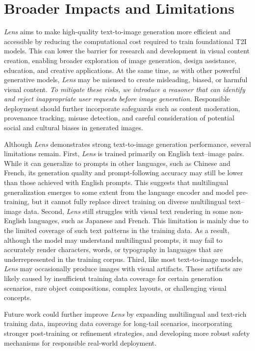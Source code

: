 \documentclass{llmxive}
\begin{document}
\section{Broader Impacts and Limitations}
\label{sec:limitations}

\textit{Lens} aims to make high-quality text-to-image generation more efficient and accessible by reducing the computational cost required to train foundational T2I models. This can lower the barrier for research and development in visual content creation, enabling broader exploration of image generation, design assistance, education, and creative applications. At the same time, as with other powerful generative models, \textit{Lens} may be misused to create misleading, biased, or harmful visual content. \textit{To mitigate these risks, we introduce a reasoner that can identify and reject inappropriate user requests before image generation.} Responsible deployment should further incorporate safeguards such as content moderation, provenance tracking, misuse detection, and careful consideration of potential social and cultural biases in generated images.

Although \textit{Lens} demonstrates strong text-to-image generation performance, several limitations remain. First, \textit{Lens} is trained primarily on English text--image pairs. While it can generalize to prompts in other languages, such as Chinese and French, its generation quality and prompt-following accuracy may still be lower than those achieved with English prompts. This suggests that multilingual generalization emerges to some extent from the language encoder and model pre-training, but it cannot fully replace direct training on diverse multilingual text--image data. Second, \textit{Lens} still struggles with visual text rendering in some non-English languages, such as Japanese and French. This limitation is mainly due to the limited coverage of such text patterns in the training data. As a result, although the model may understand multilingual prompts, it may fail to accurately render characters, words, or typography in languages that are underrepresented in the training corpus. Third, like most text-to-image models, \textit{Lens} may occasionally produce images with visual artifacts. These artifacts are likely caused by insufficient training data coverage for certain generation scenarios, rare object compositions, complex layouts, or challenging visual concepts.

Future work could further improve \textit{Lens} by expanding multilingual and text-rich training data, improving data coverage for long-tail scenarios, incorporating stronger post-training or refinement strategies, and developing more robust safety mechanisms for responsible real-world deployment.
\end{document}
